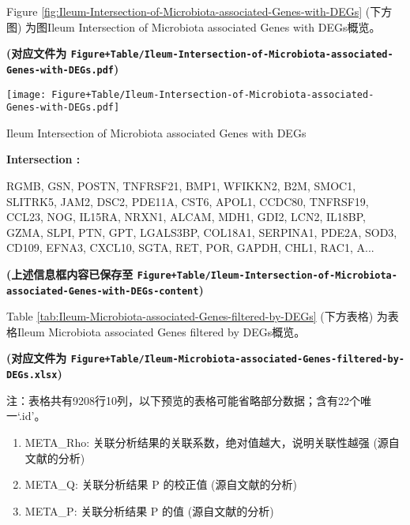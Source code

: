 \documentclass[
]{article}
\providecommand{\tightlist}{%
  \setlength{\itemsep}{0pt}\setlength{\parskip}{0pt}}
\begin{document}
Figure \ref{fig:Ileum-Intersection-of-Microbiota-associated-Genes-with-DEGs} (下方图) 为图Ileum Intersection of Microbiota associated Genes with DEGs概览。

\textbf{(对应文件为 \texttt{Figure+Table/Ileum-Intersection-of-Microbiota-associated-Genes-with-DEGs.pdf})}

\def\@captype{figure}
\begin{center}
\texttt{[image: Figure+Table/Ileum-Intersection-of-Microbiota-associated-Genes-with-DEGs.pdf]}
\caption{Ileum Intersection of Microbiota associated Genes with DEGs}\label{fig:Ileum-Intersection-of-Microbiota-associated-Genes-with-DEGs}
\end{center}
\begin{center}\begin{tcolorbox}[colback=gray!10, colframe=gray!50, width=0.9\linewidth, arc=1mm, boxrule=0.5pt]
\textbf{
Intersection
:}

\vspace{0.5em}

    RGMB, GSN, POSTN, TNFRSF21, BMP1, WFIKKN2, B2M, SMOC1,
SLITRK5, JAM2, DSC2, PDE11A, CST6, APOL1, CCDC80, TNFRSF19,
CCL23, NOG, IL15RA, NRXN1, ALCAM, MDH1, GDI2, LCN2, IL18BP,
GZMA, SLPI, PTN, GPT, LGALS3BP, COL18A1, SERPINA1, PDE2A,
SOD3, CD109, EFNA3, CXCL10, SGTA, RET, POR, GAPDH, CHL1,
RAC1, A...

\vspace{2em}
\end{tcolorbox}
\end{center}

\textbf{(上述信息框内容已保存至 \texttt{Figure+Table/Ileum-Intersection-of-Microbiota-associated-Genes-with-DEGs-content})}

Table \ref{tab:Ileum-Microbiota-associated-Genes-filtered-by-DEGs} (下方表格) 为表格Ileum Microbiota associated Genes filtered by DEGs概览。

\textbf{(对应文件为 \texttt{Figure+Table/Ileum-Microbiota-associated-Genes-filtered-by-DEGs.xlsx})}

\begin{center}\begin{tcolorbox}[colback=gray!10, colframe=gray!50, width=0.9\linewidth, arc=1mm, boxrule=0.5pt]注：表格共有9208行10列，以下预览的表格可能省略部分数据；含有22个唯一`.id'。
\end{tcolorbox}
\end{center}
\begin{center}\begin{tcolorbox}[colback=gray!10, colframe=gray!50, width=0.9\linewidth, arc=1mm, boxrule=0.5pt]\begin{enumerate}\tightlist
\item META\_Rho:  关联分析结果的关联系数，绝对值越大，说明关联性越强 (源自文献的分析)
\item META\_Q:  关联分析结果 P 的校正值 (源自文献的分析)
\item META\_P:  关联分析结果 P 的值 (源自文献的分析)
\end{enumerate}\end{tcolorbox}
\end{center}
\end{document}
